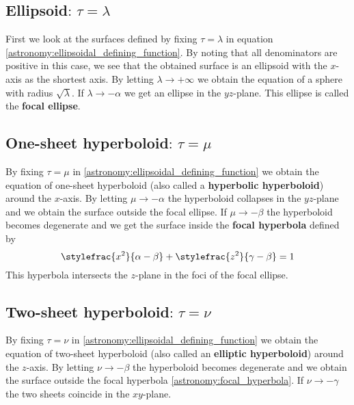 	\subsection{Ellipsoid\texorpdfstring{$\text{: }\tau = \lambda$}{}}
    First we look at the surfaces defined by fixing $\tau = \lambda$ in equation \ref{astronomy:ellipsoidal_defining_function}. By noting that all denominators are positive in this case, we see that the obtained surface is an ellipsoid with the $x$-axis as the shortest axis. By letting $\lambda\rightarrow+\infty$ we obtain the equation of a sphere with radius $\sqrt{\lambda}$. If $\lambda\rightarrow-\alpha$ we get an ellipse in the $yz$-plane. This ellipse is called the \textbf{focal ellipse}.
    
    \subsection{One-sheet hyperboloid\texorpdfstring{$\text{: }\tau = \mu$}{}}
    By fixing $\tau=\mu$ in \ref{astronomy:ellipsoidal_defining_function} we obtain the equation of one-sheet hyperboloid (also called a \textbf{hyperbolic hyperboloid}) around the $x$-axis. By letting $\mu\rightarrow-\alpha$ the hyperboloid collapses in the $yz$-plane and we obtain the surface outside the focal ellipse. If $\mu\rightarrow-\beta$ the hyperboloid becomes degenerate and we get the surface inside the \textbf{focal hyperbola} defined by
    \begin{equation}
    	\label{astronomy:focal_hyperbola}
    	\stylefrac{x^2}{\alpha-\beta} + \stylefrac{z^2}{\gamma-\beta} = 1
    \end{equation}
    This hyperbola intersects the $z$-plane in the foci of the focal ellipse.
    
    \subsection{Two-sheet hyperboloid\texorpdfstring{$\text{: }\tau = \nu$}{}}
    By fixing $\tau=\nu$ in \ref{astronomy:ellipsoidal_defining_function} we obtain the equation of two-sheet hyperboloid (also called an \textbf{elliptic hyperboloid}) around the $z$-axis. By letting $\nu\rightarrow-\beta$ the hyperboloid becomes degenerate and we obtain the surface outside the focal hyperbola \ref{astronomy:focal_hyperbola}. If $\nu\rightarrow-\gamma$ the two sheets coincide in the $xy$-plane.
    
